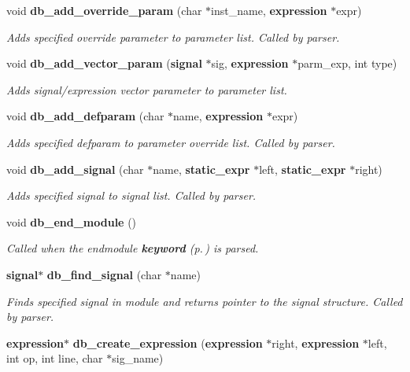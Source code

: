 \begin{CompactItemize}
void {\bf db\_\-add\_\-override\_\-param} (char $\ast$inst\_\-name, {\bf expression} $\ast$expr)
\begin{CompactList}\small\item\em Adds specified override parameter to parameter list. Called by parser.\item\end{CompactList}\item 
void {\bf db\_\-add\_\-vector\_\-param} ({\bf signal} $\ast$sig, {\bf expression} $\ast$parm\_\-exp, int type)
\begin{CompactList}\small\item\em Adds signal/expression vector parameter to parameter list.\item\end{CompactList}\item 
void {\bf db\_\-add\_\-defparam} (char $\ast$name, {\bf expression} $\ast$expr)
\begin{CompactList}\small\item\em Adds specified defparam to parameter override list. Called by parser.\item\end{CompactList}\item 
void {\bf db\_\-add\_\-signal} (char $\ast$name, {\bf static\_\-expr} $\ast$left, {\bf static\_\-expr} $\ast$right)
\begin{CompactList}\small\item\em Adds specified signal to signal list. Called by parser.\item\end{CompactList}\item 
void {\bf db\_\-end\_\-module} ()
\begin{CompactList}\small\item\em Called when the endmodule {\bf keyword} {\rm (p.\,\pageref{structkeyword})} is parsed.\item\end{CompactList}\item 
{\bf signal}$\ast$ {\bf db\_\-find\_\-signal} (char $\ast$name)
\begin{CompactList}\small\item\em Finds specified signal in module and returns pointer to the signal structure. Called by parser.\item\end{CompactList}\item 
{\bf expression}$\ast$ {\bf db\_\-create\_\-expression} ({\bf expression} $\ast$right, {\bf expression} $\ast$left, int op, int line, char $\ast$sig\_\-name)

\end{CompactItemize}
